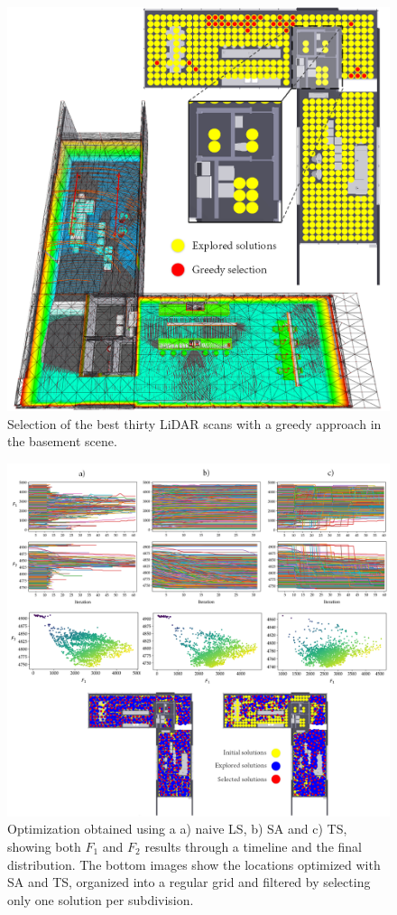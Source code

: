 \begin{figure}
    \centering
    \includegraphics[width=\linewidth]{figs/lidar_optimization/greedy_results.png}
	\caption{Selection of the best thirty LiDAR scans with a greedy approach in the basement scene.}
	\label{fig:greedy_results}
\end{figure}

\begin{figure}
    \centering
    \includegraphics[width=.9\linewidth]{figs/lidar_optimization/local_search_results.png}
	\caption{Optimization obtained using a a) naive LS, b) SA and c) TS, showing both $F_1$ and $F_2$ results through a timeline and the final distribution. The bottom images show the locations optimized with SA and TS, organized into a regular grid and filtered by selecting only one solution per subdivision.}
	\label{fig:local_search_results}
\end{figure}

